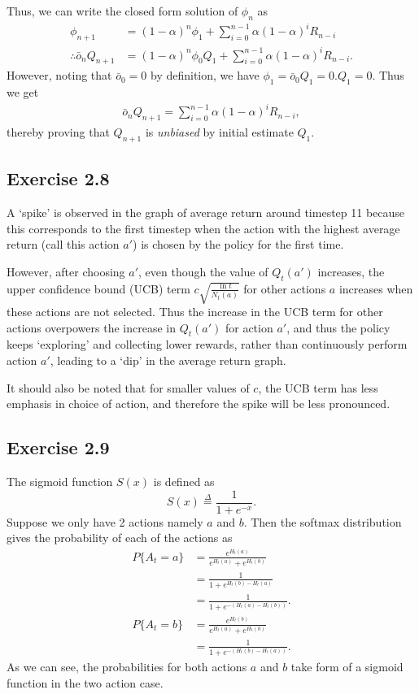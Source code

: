 \documentclass[10pt]{article}
\newcommand{\ldef}{\stackrel{\Delta}{=}}
\begin{document}
	Thus, we can write the closed form solution of $\phi_n$ as
	\begin{align*}
	\phi_{n+1} &= (1-\alpha)^n \phi_1 + \sum_{i=0}^{n-1} \alpha(1-\alpha)^{i}R_{n-i}\\
	\therefore\bar{o}_nQ_{n+1} &= (1-\alpha)^n\phi_0 Q_1 + \sum_{i=0}^{n-1} \alpha(1-\alpha)^i R_{n-i}.
	\end{align*}
	However, noting that $\bar{o}_0 = 0$ by definition, we have $\phi_1 = \bar{o}_0 Q_1 = 0.Q_1 = 0$. Thus we get
	\begin{align*}
	\bar{o}_nQ_{n+1} = \sum_{i=0}^{n-1} \alpha(1-\alpha)^i R_{n-i},
	\end{align*}
	thereby proving that $Q_{n+1}$ is \emph{unbiased} by initial estimate $Q_1$.
	\subsection*{Exercise 2.8}
	\label{ss:2.8}
	A `spike' is observed in the graph of average return around timestep 11 because this corresponds to the first timestep when the action with the highest average return (call this action $a'$) is chosen by the policy for the first time. \par\noindent
	However, after choosing $a'$, even though the value of $Q_t(a')$ increases, the upper confidence bound (UCB) term $c\sqrt{ \frac{\ln t}{N_t(a)} }$ for other actions $a$ increases when these actions are not selected. Thus the increase in the UCB term for other actions overpowers the increase in $Q_t(a')$ for action $a'$, and thus the policy keeps `exploring' and collecting lower rewards, rather than continuously perform action $a'$, leading to a `dip' in the average return graph. \par\noindent
	It should also be noted that for smaller values of $c$, the UCB term has less emphasis in choice of action, and therefore the spike will be less pronounced.
	\subsection*{Exercise 2.9}
	The sigmoid function $S(x)$ is defined as
	\begin{equation*}
	S(x) \ldef \frac{1}{1+e^{-x}}.
	\end{equation*}
	Suppose we only have 2 actions namely $a$ and $b$. Then the softmax distribution gives the probability of each of the actions as
	\begin{align*}
	P \{ A_t = a \} &= \frac{e^{H_t(a)}}{e^{H_t(a)} + e^{H_t(b)} }\\
	&= \frac{1}{1 + e^{H_t(b) - H_t(a)}}\\
	&= \frac{1}{1 + e^{-(H_t(a) - H_t(b))}}.\\
	P \{ A_t = b \} &= \frac{e^{H_t(b)}}{e^{H_t(a)} + e^{H_t(b)} }\\
	&= \frac{1}{1 + e^{-(H_t(b) - H_t(a))}}.
	\end{align*}
	As we can see, the probabilities for both actions $a$ and $b$ take form of a sigmoid function in the two action case.
\end{document}
